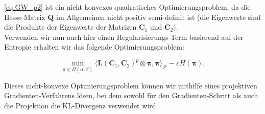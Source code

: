 \documentclass[11pt,a4paper]{article}
\newtheorem{definition}[theorem]{Definition}
\numberwithin{equation}{section}
\begin{document}
	\autoref{eq:GW_p2} ist ein nicht konvexes quadratisches Optimierungsproblem, da die Hesse-Matrix $\boldsymbol{Q}$ im Allgemeinen nicht positiv semi-definit ist (die Eigenwerte sind die Produkte der Eigenwerte der Matrizen $\boldsymbol{C}_1$ und $\boldsymbol{C}_2)$.\\
	
	
	Verwenden wir nun auch hier einen Regularisierungs-Term basierend auf der Entropie erhalten wir das folgende Optimierungsproblem:
	
	\begin{equation}
	\min_{\pi \in \Pi (\alpha , \beta)}{\langle \boldsymbol{L}(\boldsymbol{C}_1, \boldsymbol{C}_2)^p \otimes \boldsymbol{\pi}, \boldsymbol{\pi} \rangle_\mathcal{F} - \varepsilon H(\boldsymbol{\pi})}. \label{eq:GWprob_regularised2}
	\end{equation}
	
	Dieses nicht-konvexe Optimierungsproblem können wir mithilfe eines projektiven Gradienten-Verfahrens lösen, bei dem sowohl für den Gradienten-Schritt als auch die Projektion die KL-Divergenz verwendet wird.\\
	

	
	
	
	
\end{document}

